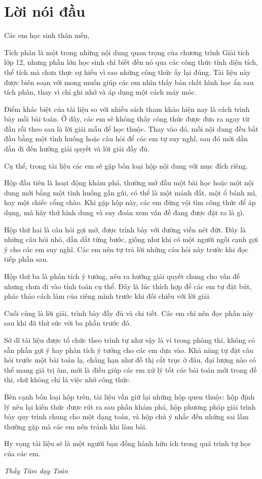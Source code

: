 \section*{Lời nói đầu}

Các em học sinh thân mến,

\medskip
Tích phân là một trong những nội dung quan trọng của chương trình Giải tích lớp 12, nhưng phần lớn học sinh chỉ biết đến nó qua các công thức tính diện tích, thể tích mà chưa thực sự hiểu vì sao những công thức ấy lại đúng. Tài liệu này được biên soạn với mong muốn giúp các em nhìn thấy bản chất hình học ẩn sau tích phân, thay vì chỉ ghi nhớ và áp dụng một cách máy móc.

Điểm khác biệt của tài liệu so với nhiều sách tham khảo hiện nay là cách trình bày mỗi bài toán. Ở đây, các em sẽ không thấy công thức được đưa ra ngay từ đầu rồi theo sau là lời giải mẫu để học thuộc. Thay vào đó, mỗi nội dung đều bắt đầu bằng một tình huống hoặc câu hỏi để các em tự suy nghĩ, sau đó mới dần dần đi đến hướng giải quyết và lời giải đầy đủ.

Cụ thể, trong tài liệu các em sẽ gặp bốn loại hộp nội dung với mục đích riêng.

Hộp đầu tiên là hoạt động khám phá, thường mở đầu một bài học hoặc một nội dung mới bằng một tình huống gần gũi, có thể là một mảnh đất, một ổ bánh mì, hay một chiếc cổng chào. Khi gặp hộp này, các em đừng vội tìm công thức để áp dụng, mà hãy thử hình dung và suy đoán xem vấn đề đang được đặt ra là gì.

Hộp thứ hai là câu hỏi gợi mở, được trình bày với đường viền nét đứt. Đây là những câu hỏi nhỏ, dẫn dắt từng bước, giống như khi có một người ngồi cạnh gợi ý cho các em suy nghĩ. Các em nên tự trả lời những câu hỏi này trước khi đọc tiếp phần sau.

Hộp thứ ba là phân tích ý tưởng, nêu ra hướng giải quyết chung cho vấn đề nhưng chưa đi vào tính toán cụ thể. Đây là lúc thích hợp để các em tự đặt bút, phác thảo cách làm của riêng mình trước khi đối chiếu với lời giải.

Cuối cùng là lời giải, trình bày đầy đủ và chi tiết. Các em chỉ nên đọc phần này sau khi đã thử sức với ba phần trước đó.

Sở dĩ tài liệu được tổ chức theo trình tự như vậy là vì trong phòng thi, không có sẵn phần gợi ý hay phân tích ý tưởng cho các em dựa vào. Khả năng tự đặt câu hỏi trước một bài toán lạ, chẳng hạn như đồ thị cắt trục ở đâu, đại lượng nào có thể mang giá trị âm, mới là điều giúp các em xử lý tốt các bài toán mới trong đề thi, chứ không chỉ là việc nhớ công thức.

Bên cạnh bốn loại hộp trên, tài liệu vẫn giữ lại những hộp quen thuộc: hộp định lý nêu lại kiến thức được rút ra sau phần khám phá, hộp phương pháp giải trình bày quy trình chung cho một dạng toán, và hộp chú ý nhắc đến những sai lầm thường gặp mà các em nên tránh khi làm bài.

Hy vọng tài liệu sẽ là một người bạn đồng hành hữu ích trong quá trình tự học của các em.

\bigskip
\hfill \textit{Thầy Tâm dạy Toán}

\newpage
